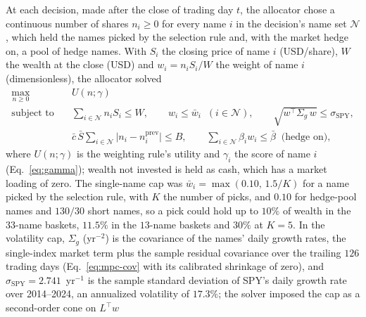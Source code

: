At each decision, made after the close of trading day $t$, the allocator chose a continuous number of shares
$n_i \ge 0$ for every name $i$ in the decision's name set $\mathcal{N}$, which held the names picked by the selection
rule and, with the market hedge on, a pool of hedge names. With $S_i$ the closing price of name $i$ (USD/share), $W$
the wealth at the close (USD) and $w_i = n_i S_i / W$ the weight of name $i$ (dimensionless), the allocator solved
\begin{equation}
\begin{aligned}
\max_{n \ge 0}\quad & U(n;\gamma) \\
\text{subject to}\quad & \textstyle\sum_{i \in \mathcal{N}} n_i S_i \le W, \qquad
  w_i \le \bar w_i \;\; (i \in \mathcal{N}), \qquad \sqrt{w^{\top} \Sigma_g\, w} \le \sigma_{\mathrm{SPY}}, \\
& \bar c\, \bar S \textstyle\sum_{i \in \mathcal{N}} \lvert n_i - n_i^{\mathrm{prev}} \rvert \le B, \qquad
  \textstyle\sum_{i \in \mathcal{N}} \beta_i w_i \le \bar\beta \;\; \text{(hedge on)},
\end{aligned}
\label{eq:allocation}
\end{equation}
where $U(n;\gamma)$ is the weighting rule's utility and $\gamma_i$ the score of name $i$ (Eq.~\ref{eq:gamma}); wealth
not invested is held as cash, which has a market loading of zero.
The single-name cap was $\bar w_i = \max(0.10,\, 1.5/K)$ for a name picked by the selection rule, with $K$ the number
of picks, and $0.10$ for hedge-pool names and $130/30$ short names, so a pick could hold up to $10\%$ of wealth in the
$33$-name baskets, $11.5\%$ in the $13$-name baskets and $30\%$ at $K = 5$. In the volatility cap, $\Sigma_g$
(yr$^{-2}$) is the covariance of the names' daily growth rates, the single-index market term plus the sample
residual covariance over the trailing $126$ trading days (Eq.~\ref{eq:mpc-cov} with its calibrated shrinkage of
zero), and $\sigma_{\mathrm{SPY}} = 2.741$~yr$^{-1}$ is the sample standard deviation of SPY's daily growth rate over
2014--2024, an annualized volatility of $17.3\%$; the solver imposed the cap as a second-order cone on $L^{\top} w$
